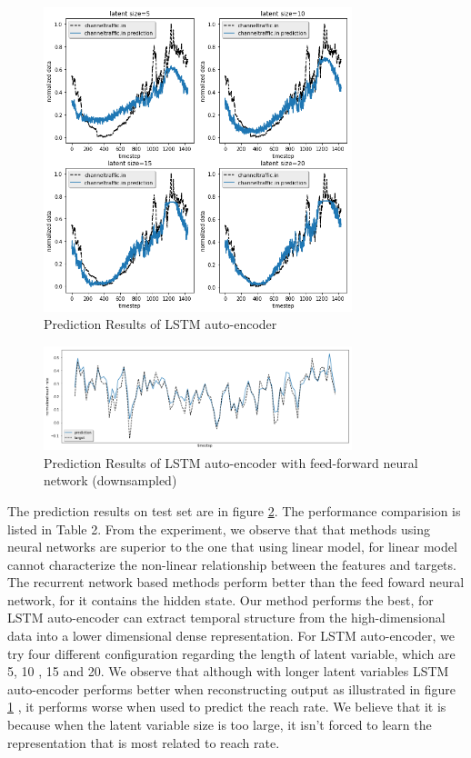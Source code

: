 \documentclass[5p]{elsarticle}
\newcommand{\dabiaolv}{reach rate}
\begin{document}
\begin{figure}[h]
    \centering
    \includegraphics[width=0.8\textwidth]{lstm_auto_encoder_result.png}
    \caption{Prediction Results of LSTM auto-encoder}
    \label{fig:prediction_Results_of_LSTM_auto_encoder}
\end{figure}

\begin{figure}[h]
    \centering
    \includegraphics[width=0.8\textwidth]{result.png}
    \caption{Prediction Results of LSTM auto-encoder with feed-forward neural network (downsampled)}
    \label{fig:prediction_results}
\end{figure}

The prediction results on test set are in figure \ref{fig:prediction_results}. The performance comparision is listed in Table 2. From the experiment, we observe that that methods using neural networks are superior to the one that using linear model, for linear model cannot characterize the non-linear relationship between the features and targets. The recurrent network based methods perform better than the feed foward neural network, for it contains the hidden state. Our method performs the best, for LSTM auto-encoder can extract temporal structure from the high-dimensional data into a lower dimensional dense representation. For LSTM auto-encoder, we try four different configuration regarding the length of latent variable, which are 5, 10 , 15 and 20. We observe that although with longer latent variables LSTM auto-encoder performs better when reconstructing output as illustrated in figure \ref{fig:prediction_Results_of_LSTM_auto_encoder} , it performs worse when used to predict the \dabiaolv . We believe that it is because when the latent variable size is too large, it isn't forced to learn the representation that is most related to \dabiaolv.     
 
\end{document}
